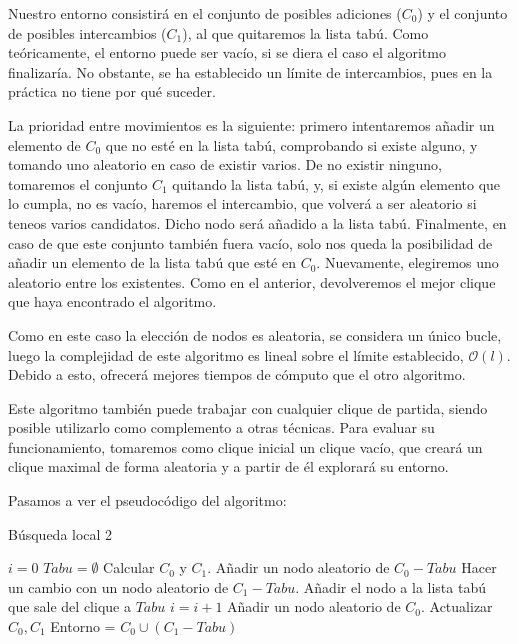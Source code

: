 Nuestro entorno consistirá en el conjunto de posibles adiciones ($C_0$) y el conjunto de
posibles intercambios ($C_1$), al que quitaremos la lista tabú. Como teóricamente, el entorno
puede ser vacío, si se diera el caso el algoritmo finalizaría. No obstante, se ha establecido un
límite de intercambios, pues en la práctica no tiene por qué suceder.

La prioridad entre movimientos es la siguiente: primero intentaremos añadir un elemento de
$C_0$ que no esté en la lista tabú, comprobando si existe alguno, y tomando uno aleatorio
en caso de existir varios. De no existir ninguno, tomaremos el conjunto $C_1$ quitando
la lista tabú, y, si existe algún elemento que lo cumpla, no es vacío, haremos el intercambio,
que volverá a ser aleatorio si teneos varios candidatos. Dicho nodo será añadido a la lista tabú.
Finalmente, en caso de que este conjunto también fuera vacío, solo nos queda la posibilidad de añadir un
elemento de la lista tabú que esté en $C_0$. Nuevamente, elegiremos uno aleatorio entre los existentes.
Como en el anterior, devolveremos el mejor clique que haya encontrado el algoritmo.

Como en este caso la elección de nodos es aleatoria, se considera un único bucle,
luego la complejidad de este algoritmo es lineal sobre el límite establecido,
$\mathcal{O}(l)$. Debido a esto, ofrecerá mejores tiempos de cómputo que el otro
algoritmo.

Este algoritmo también puede trabajar con cualquier clique de partida, siendo posible
utilizarlo como complemento a otras técnicas. Para evaluar su funcionamiento, tomaremos
como clique inicial un clique vacío, que creará un clique maximal de forma aleatoria
y a partir de él explorará su entorno.

Pasamos a ver el pseudocódigo del algoritmo:

\begin{algorithm}[H]
\caption{Búsqueda local 2}
  \begin{algorithmic}
    \State $i = 0$
    \State $Tabu = \emptyset$
    \State Calcular $C_0$ y $C_1$.
    \Repeat
        \State Añadir un nodo aleatorio de $C_0 - Tabu$
        \State Hacer un cambio con un nodo aleatorio de $C_1 - Tabu$.
        \State Añadir el nodo a la lista tabú que sale del clique a $Tabu$
        \State $i = i + 1$
        \State Añadir un nodo aleatorio de $C_0$.
      \EndIf
      \State Actualizar $C_0, C_1$
      \State Entorno = $C_0 \cup (C_1 - Tabu)$
  \end{algorithmic}
\end{algorithm}

